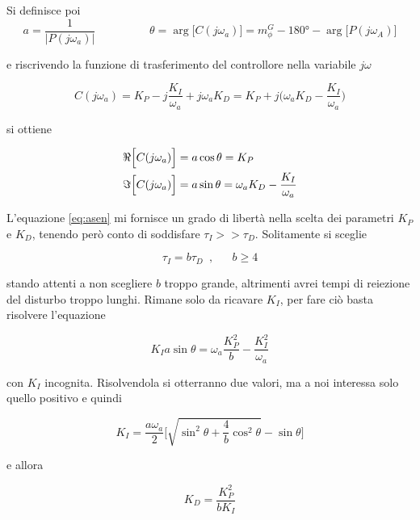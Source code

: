 \documentclass[english]{article}
\newcommand{\trippleSpacing}{\phantom{aaa}}	%
\newcommand{\singleSpacing}{\phantom{a}}	%
\begin{document}
		\noindent Si definisce poi 
		\begin{equation}
			a=\frac{1}{|P(j\omega_a)|} \trippleSpacing \trippleSpacing \trippleSpacing \theta=\arg\bigl[C(j\omega_a)\bigl]=m_{\phi}^G-180°-\arg\bigl[P(j\omega_A)\bigl]
		\end{equation}
	
		\noindent e riscrivendo la funzione di trasferimento del controllore nella variabile $j\omega$
		
		\begin{equation}
			C(j\omega_a)=K_P-j\frac{K_I}{\omega_a}+j\omega_aK_D=K_P+j\bigl(\omega_aK_D-\frac{K_I}{\omega_a}\bigl)
		\end{equation}
		
		\noindent si ottiene
		
		\begin{align}
			\Re\Bigl[C(j\omega_a)\Bigl] &= a\cos\theta=K_P \\
			\Im\Bigl[C(j\omega_a)\Bigl] &= a\sin\theta=\omega_aK_D-\frac{K_I}{\omega_a}
			\label{eq:asen}
		\end{align}
	
		\noindent L'equazione \ref{eq:asen} mi fornisce un grado di libertà nella scelta dei parametri $K_P$ e $K_D$, tenendo però conto di soddisfare $\tau_I>>\tau_D$. Solitamente si sceglie 
		
		\begin{equation}
			\tau_I=b\tau_D \singleSpacing, \trippleSpacing b\ge4
		\end{equation}
	
		\noindent stando attenti a non scegliere $b$ troppo grande, altrimenti avrei tempi di reiezione del disturbo troppo lunghi. Rimane solo da ricavare $K_I$, per fare ciò basta risolvere l'equazione
		
		\begin{equation}
			K_Ia\sin\theta=\omega_a\frac{K_P^2}{b}-\frac{K_I^2}{\omega_a}
		\end{equation}
	
		\noindent con $K_I$ incognita. Risolvendola si otterranno due valori, ma a noi interessa solo quello positivo e quindi
		
		\begin{equation}
			K_I=\frac{a\omega_a}{2}\Biggl[\sqrt{\sin^2\theta+\frac{4}{b}\cos^2\theta}-\sin\theta\Biggl]
		\end{equation}
		
		\noindent e allora
		
		\begin{equation}
			K_D=\frac{K_P^2}{bK_I}
		\end{equation}
		
\end{document}

